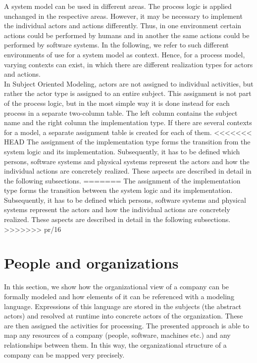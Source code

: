 A system model can be used in different areas. The process logic is applied unchanged in the respective areas. However, it may be necessary to implement the individual actors and actions differently. Thus, in one environment certain actions could be performed by humans and in another the same actions could be performed by software systems. In the following, we refer to such different environments of use for a system model as context. Hence, for a process model, varying contexts can exist, in which there are different realization types for actors and actions.\\ 
In Subject Oriented Modeling, actors are not assigned to individual activities, but rather the actor type is assigned to an entire subject. This assignment is not part of the process logic, but in the most simple way it is done instead for each process in a separate two-column table. The left column contains the subject name and the right column the implementation type. If there are several contexts for a model, a separate assignment table is created for each of them.
<<<<<<< HEAD
The assignment of the implementation type forms the transition from the system logic and its implementation. Subsequently, it has to be defined which persons, software systems and physical systems represent the actors and how the individual actions are concretely realized. These aspects are described in detail in the following subsections.
=======
The assignment of the implementation type forms the transition between the system logic and its implementation. Subsequently, it has to be defined which persons, software systems and physical systems represent the actors and how the individual actions are concretely realized. These aspects are described in detail in the following subsections.
>>>>>>> pr/16

\section{People and organizations}

In this section, we show how the organizational view of a company can be formally modeled and how elements of it can be referenced with a modeling language.  Expressions of this language are stored in the subjects (the abstract actors) and resolved at runtime into concrete actors of the organization. These are then assigned the activities for processing. The presented approach is able to map any resources of a company (people, software, machines etc.) and any relationships between them. In this way, the organizational structure of a company can be mapped very precisely. 

